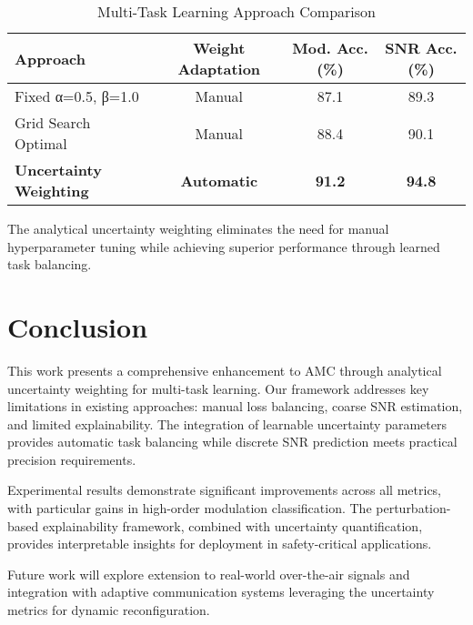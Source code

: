 \documentclass[conference]{IEEEtran}
\begin{document}
\begin{table}[htbp]
\caption{Multi-Task Learning Approach Comparison}
\begin{center}
\begin{tabular}{lccc}
\toprule
Approach & Weight Adaptation & Mod. Acc. (\%) & SNR Acc. (\%) \\
\midrule
Fixed α=0.5, β=1.0 & Manual & 87.1 & 89.3 \\
Grid Search Optimal & Manual & 88.4 & 90.1 \\
\textbf{Uncertainty Weighting} & \textbf{Automatic} & \textbf{91.2} & \textbf{94.8} \\
\bottomrule
\end{tabular}
\label{tab:mtl_comparison}
\end{center}
\end{table}

The analytical uncertainty weighting eliminates the need for manual hyperparameter tuning while achieving superior performance through learned task balancing.

\section{Conclusion}

This work presents a comprehensive enhancement to AMC through analytical uncertainty weighting for multi-task learning. Our framework addresses key limitations in existing approaches: manual loss balancing, coarse SNR estimation, and limited explainability. The integration of learnable uncertainty parameters provides automatic task balancing while discrete SNR prediction meets practical precision requirements.

Experimental results demonstrate significant improvements across all metrics, with particular gains in high-order modulation classification. The perturbation-based explainability framework, combined with uncertainty quantification, provides interpretable insights for deployment in safety-critical applications.

Future work will explore extension to real-world over-the-air signals and integration with adaptive communication systems leveraging the uncertainty metrics for dynamic reconfiguration.
\end{document}
